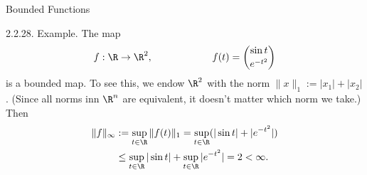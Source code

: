 \documentclass[smaller,hyperref={CJKbookmarks=true}]{beamer}
\begin{document}
\begin{frame}[c]{Bounded Functions}
\begin{spacing}{1.05}
\alert{2.2.28. Example.} The map
\[f:\R\to\R^2,\qquad\qquad\qquad f(t)=\binom{\sin t}{e^{-t^2}}\]
is a bounded map. To see this, we endow $\R^2$ with the norm $\|x\|_1:=|x_1|+|x_2|$. (Since all norms inn $\R^n$ are equivalent, it doesn't matter which norm we take.) Then
\begin{equation*}
  \begin{split}
     \|f\|_{\infty} &:=\sup\limits_{t\in\R}\|f(t)\|_1=\sup\limits_{t\in\R}(|\sin t|+|e^{-t^2}|) \\
       &\leq\sup\limits_{t\in\R}|\sin t|+\sup\limits_{t\in\R}|e^{-t^2}|=2<\infty.
  \end{split}
\end{equation*}
\end{spacing}
\end{frame}
\end{document}
